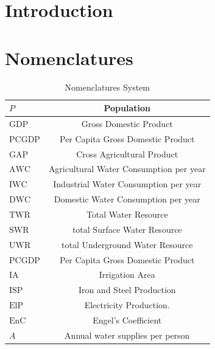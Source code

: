 
\section{Introduction}

\section{Nomenclatures}

\begin{table}[!htb]

  \centering
  \begin{tabular}{||l|c||}
    \hline
    $P$   & Population \\
    \hline
    $\text{GDP}$ & Gross Domestic Product \\
    \hline
    $\text{PCGDP}$ & Per Capita Gross Domestic Product \\
    \hline
    $\text{GAP}$ & Cross Agricultural Product \\
    \hline
    $\text{AWC}$ & Agricultural Water Consumption per year \\
    \hline
    $\text{IWC}$ & Industrial Water Consumption per year \\
    \hline
    $\text{DWC}$ & Domestic Water Consumption per year \\
    \hline
    $\text{TWR}$ & Total Water Resource \\
    \hline
    $\text{SWR}$ & total Surface Water Resource \\
    \hline
    $\text{UWR}$ & total Underground Water Resource \\
    \hline
    $\text{PCGDP}$ & Per Capita Gross Domestic Product \\
    \hline
    $\text{IA}$ & Irrigation Area \\
    \hline
    $\text{ISP}$ & Iron and Steel Production \\
    \hline
    $\text{ElP}$ & Electricity Production. \\
    \hline
    $\text{EnC}$ & Engel's Coefficient \\
    \hline
    $A$          & Annual water supplies per person \\
    \hline
  \end{tabular}
  \caption{Nomenclatures System}
  \label{tab: Nomenclatures sys}
\end{table}

